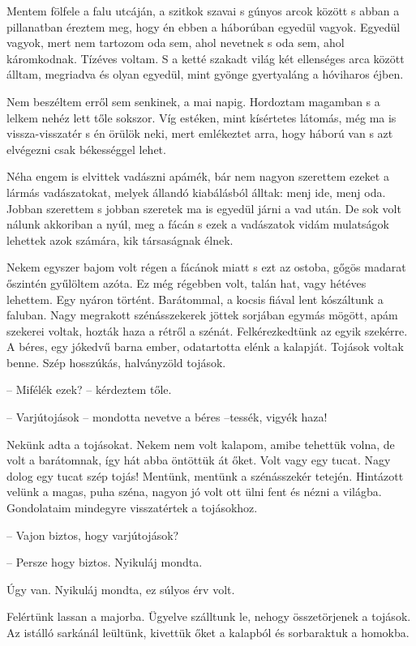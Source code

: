 \documentclass{IEEEtran}
\begin{document}
Mentem fölfele a falu utcáján, a szitkok szavai s gúnyos arcok között s abban a pillanatban éreztem meg, hogy én ebben a háborúban egyedül vagyok. Egyedül vagyok, mert nem tartozom oda sem, ahol nevetnek s oda sem, ahol káromkodnak. Tízéves voltam. S a ketté szakadt világ két ellenséges arca között álltam, megriadva és olyan egyedül, mint gyönge gyertyaláng a hóviharos éjben.

Nem beszéltem erről sem senkinek, a mai napig. Hordoztam magamban s a lelkem nehéz lett tőle sokszor. Víg estéken, mint kísértetes látomás, még ma is vissza-visszatér s én örülök neki, mert emlékeztet arra, hogy háború van s azt elvégezni csak békességgel lehet.

Néha engem is elvittek vadászni apámék, bár nem nagyon szerettem ezeket a lármás vadászatokat, melyek állandó kiabálásból álltak: menj ide, menj oda. Jobban szerettem s jobban szeretek ma is egyedül járni a vad után. De sok volt nálunk akkoriban a nyúl, meg a fácán s ezek a vadászatok vidám mulatságok lehettek azok számára, kik társaságnak élnek.

Nekem egyszer bajom volt régen a fácánok miatt s ezt az ostoba, gőgös madarat őszintén gyűlöltem azóta. Ez még régebben volt, talán hat, vagy hétéves lehettem. Egy nyáron történt. Barátommal, a kocsis fiával lent kószáltunk a faluban. Nagy megrakott szénásszekerek jöttek sorjában egymás mögött, apám szekerei voltak, hozták haza a rétről a szénát. Felkérezkedtünk az egyik szekérre. A béres, egy jókedvű barna ember, odatartotta elénk a kalapját. Tojások voltak benne. Szép hosszúkás, halványzöld tojások.

– Mifélék ezek? – kérdeztem tőle.

– Varjútojások – mondotta nevetve a béres –tessék, vigyék haza!

Nekünk adta a tojásokat. Nekem nem volt kalapom, amibe tehettük volna, de volt a barátomnak, így hát abba öntöttük át őket. Volt vagy egy tucat. Nagy dolog egy tucat szép tojás! Mentünk, mentünk a szénásszekér tetején. Hintázott velünk a magas, puha széna, nagyon jó volt ott ülni fent és nézni a világba. Gondolataim mindegyre visszatértek a tojásokhoz.

– Vajon biztos, hogy varjútojások?

– Persze hogy biztos. Nyikuláj mondta.

Úgy van. Nyikuláj mondta, ez súlyos érv volt.

Felértünk lassan a majorba. Ügyelve szálltunk le, nehogy összetörjenek a tojások. Az istálló sarkánál leültünk, kivettük őket a kalapból és sorbaraktuk a homokba.
\end{document}
